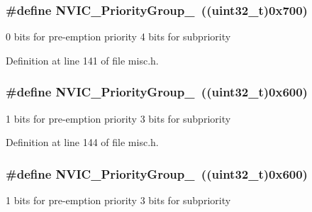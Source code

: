 \subsubsection[{\texorpdfstring{N\+V\+I\+C\+\_\+\+Priority\+Group\+\_\+0}{NVIC_PriorityGroup_0}}]{\setlength{\rightskip}{0pt plus 5cm}\#define N\+V\+I\+C\+\_\+\+Priority\+Group\+\_~(({\bf uint32\+\_\+t})0x700)}\hypertarget{group___preemption___priority___group_gaeac0cf537f65d17bc19aee2410b2b60e}{}\label{group___preemption___priority___group_gaeac0cf537f65d17bc19aee2410b2b60e}
0 bits for pre-\/emption priority 4 bits for subpriority 

Definition at line 141 of file misc.\+h.

\subsubsection[{\texorpdfstring{N\+V\+I\+C\+\_\+\+Priority\+Group\+\_\+1}{NVIC_PriorityGroup_1}}]{\setlength{\rightskip}{0pt plus 5cm}\#define N\+V\+I\+C\+\_\+\+Priority\+Group\+\_~(({\bf uint32\+\_\+t})0x600)}\hypertarget{group___preemption___priority___group_ga89bf0bf9e70f1a372a541b1b8d7493aa}{}\label{group___preemption___priority___group_ga89bf0bf9e70f1a372a541b1b8d7493aa}
1 bits for pre-\/emption priority 3 bits for subpriority 

Definition at line 144 of file misc.\+h.

\subsubsection[{\texorpdfstring{N\+V\+I\+C\+\_\+\+Priority\+Group\+\_\+1}{NVIC_PriorityGroup_1}}]{\setlength{\rightskip}{0pt plus 5cm}\#define N\+V\+I\+C\+\_\+\+Priority\+Group\+\_~(({\bf uint32\+\_\+t})0x600)}\hypertarget{group___preemption___priority___group_ga89bf0bf9e70f1a372a541b1b8d7493aa}{}\label{group___preemption___priority___group_ga89bf0bf9e70f1a372a541b1b8d7493aa}
1 bits for pre-\/emption priority 3 bits for subpriority 

